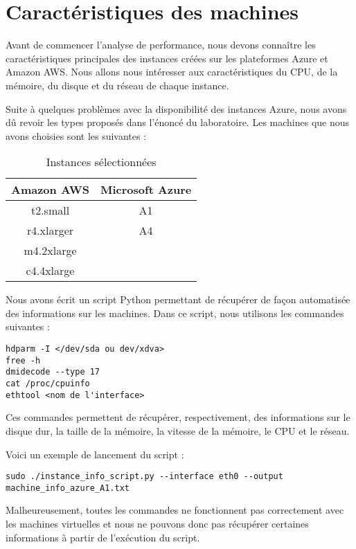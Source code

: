 \chapter{Caractéristiques des machines}\label{machines}

Avant de commencer l'analyse de performance, nous devons connaître les caractéristiques principales des instances créées sur les plateformes Azure et Amazon AWS. Nous allons nous intéresser aux caractéristiques du CPU, de la mémoire, du disque et du réseau de chaque instance. \newline

Suite à quelques problèmes avec la disponibilité des instances Azure, nous avons dû revoir les types proposés dans l'énoncé du laboratoire. Les machines que nous avons choisies sont les suivantes :

\begin{table}[h]
  \caption{Instances sélectionnées}
  \label{tab:machines_select}
  \begin{center}
    \begin{tabular}{c|c}
    Amazon AWS & Microsoft Azure \\ \hline
    t2.small & A1 \\
    r4.xlarger & A4 \\
    m4.2xlarge & \\
    c4.4xlarge & \\
    \end{tabular}
    \end{center}
\end{table}

Nous avons écrit un script Python permettant de récupérer de façon automatisée des informations sur les machines. Dans ce script, nous utilisons les commandes suivantes : 
\begin{verbatim}
hdparm -I </dev/sda ou dev/xdva>
free -h
dmidecode --type 17
cat /proc/cpuinfo
ethtool <nom de l'interface>
\end{verbatim}
Ces commandes permettent de récupérer, respectivement, des informations sur le disque dur, la taille de la mémoire, la vitesse de la mémoire, le CPU et le réseau.

Voici un exemple de lancement du script :
\begin{verbatim}
sudo ./instance_info_script.py --interface eth0 --output
machine_info_azure_A1.txt
\end{verbatim}

Malheureusement, toutes les commandes ne fonctionnent pas correctement avec les machines virtuelles et nous ne pouvons donc pas récupérer certaines informations à partir de l'exécution du script. 

